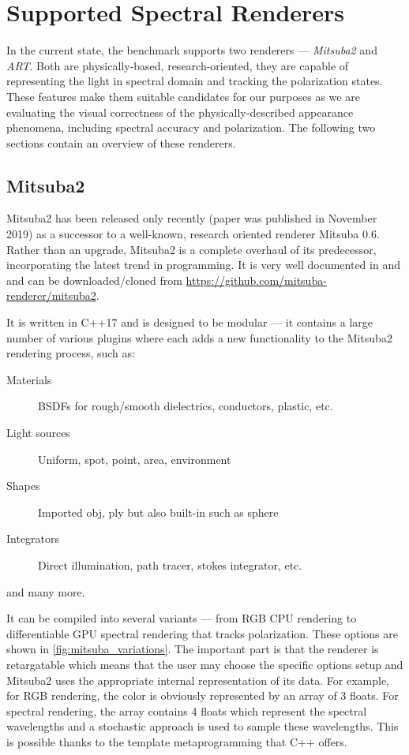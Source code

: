 \section{Supported Spectral Renderers}

In the current state, the benchmark supports two renderers --- \emph{Mitsuba2} and \emph{ART}. Both are physically-based, research-oriented, they are capable of representing the light in spectral domain and tracking the polarization states. These features make them suitable candidates for our purposes as we are evaluating the visual correctness of the physically-described appearance phenomena, including spectral accuracy and polarization. The following two sections contain an overview of these renderers.

\subsection{Mitsuba2}

Mitsuba2 has been released only recently (paper was published in November 2019) as a successor to a well-known, research oriented renderer Mitsuba 0.6. Rather than an upgrade, Mitsuba2 is a complete overhaul of its predecessor, incorporating the latest trend in programming. It is very well documented in \citet{mitsubaWeb} and \citet{nimier2019mitsuba} and can be downloaded/cloned from \url{https://github.com/mitsuba-renderer/mitsuba2}.

It is written in C++17 and is designed to be modular --- it contains a large number of various plugins where each adds a new functionality to the Mitsuba2 rendering process, such as:

\begin{description}
	\item[Materials] BSDFs for rough/smooth dielectrics, conductors, plastic, etc.
	\item[Light sources] Uniform, spot, point, area, environment
	\item[Shapes] Imported obj, ply but also built-in such as sphere
	\item[Integrators] Direct illumination, path tracer, stokes integrator, etc.
\end{description}

and many more.

It can be compiled into several variants --- from RGB CPU rendering to differentiable GPU spectral rendering that tracks polarization. These options are shown in \autoref{fig:mitsuba_variations}. The important part is that the renderer is retargatable which means that the user may choose the specific options setup and Mitsuba2 uses the appropriate internal representation of its data. For example, for RGB rendering, the color is obviously represented by an array of 3 floats. For spectral rendering, the array contains 4 floats which represent the spectral wavelengths and a stochastic approach is used to sample these wavelengths. This is possible thanks to the template metaprogramming that C++ offers.

